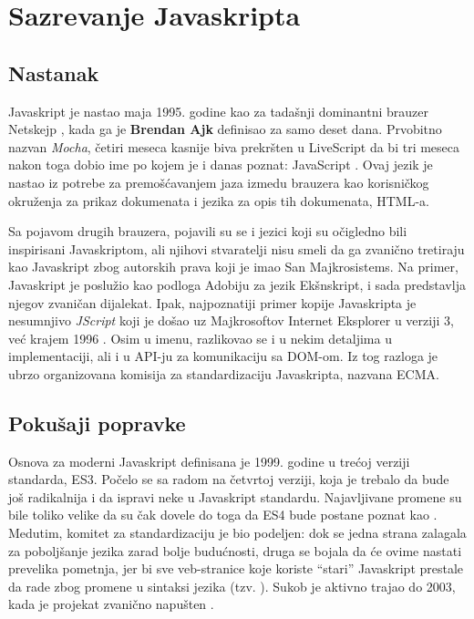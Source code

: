 \section{Sazrevanje Javaskripta}
\label{sec:sazrevanje-javaskripta}

\subsection{Nastanak}

Javaskript je nastao maja 1995. godine kao  \cite{computerworld:a-z-of-js} za tadašnji dominantni brauzer Netskejp \cite{axel-rauschmayer:impatient}, kada ga je \textbf{Brendan Ajk} definisao za samo deset dana.
Prvobitno nazvan \textsl{Mocha}, četiri meseca kasnije biva prekršten u LiveScript da bi tri meseca nakon toga dobio ime po kojem je i danas poznat: JavaScript \cite{a-brief-history-of-js}.
Ovaj jezik je nastao iz potrebe za premošćavanjem jaza izmedu brauzera kao korisničkog okruženja za prikaz dokumenata i jezika za opis tih dokumenata, HTML-a.

Sa pojavom drugih brauzera, pojavili su se i jezici koji su očigledno bili inspirisani Javaskriptom, ali njihovi stvaratelji nisu smeli da ga zvanično tretiraju kao Javaskript zbog autorskih prava koji je imao San Majkrosistems.
Na primer, Javaskript je poslužio kao podloga Adobiju za jezik Ekšnskript, i sada predstavlja njegov zvaničan dijalekat.
Ipak, najpoznatiji primer kopije Javaskripta je nesumnjivo \textsl{JScript} koji je došao uz Majkrosoftov Internet Eksplorer u verziji 3, već krajem 1996 \cite{axel-rauschmayer:speaking}.
Osim u imenu, razlikovao se i u nekim detaljima u implementaciji, ali i u API-ju za komunikaciju sa DOM-om.
Iz tog razloga je ubrzo organizovana komisija za standardizaciju Javaskripta, nazvana ECMA.

\subsection{Pokušaji popravke}

Osnova za moderni Javaskript definisana je 1999. godine u trećoj verziji standarda, ES3.
Počelo se sa radom na četvrtoj verziji, koja je trebalo da bude još radikalnija i da ispravi neke  u Javaskript standardu.
Najavljivane promene su bile toliko velike da su čak dovele do toga da ES4 bude postane poznat kao .
Medutim, komitet za standardizaciju je bio podeljen: dok se jedna strana zalagala za poboljšanje jezika zarad bolje budućnosti, druga se bojala da će ovime nastati prevelika pometnja, jer bi sve veb-stranice koje koriste “stari” Javaskript prestale da rade zbog promene u sintaksi jezika (tzv. ).
Sukob je aktivno trajao do 2003, kada je projekat zvanično napušten \cite{incomplete-js-history}.

